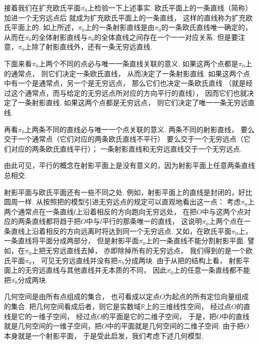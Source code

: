 接着我们在扩充欧氏平面\(\overline{\pi_0}\)上检验一下上述事实.
欧氏平面上的一条直线（简称）加进一个无穷远点后
就成为扩充欧氏平面上的一条直线，
这样的直线称为扩充欧氏平面上的.
如上所述，\(\overline{\pi_0}\)上的一条射影直线是由\(\pi_0\)的一条欧氏直线唯一确定的，
从而在\(\overline{\pi_0}\)的全体射影直线与\(\pi_0\)的全体直线之间存在一个一一对应关系.
但是要注意，\(\overline{\pi_0}\)上除了射影直线外，还有一条无穷远直线.

下面来看\(\overline{\pi_0}\)上两个不同的点必与唯一一条直线关联的意义.
如果这两个点都是\(\pi_0\)上的通常点，
则它们决定一条欧氏直线，
从而决定了一条射影直线.
如果这两个点中有一个是通常点，另一个是无穷远点，
那么它们也决定一条欧氏直线
（就是经过这个通常点，而与给定的无穷远点所对应的方向平行的直线），
因而它们也就决定了一条射影直线.
如果这两个点都是无穷远点，
则它们决定了唯一一条无穷远直线.

再看\(\overline{\pi_0}\)上两条不同的直线必与唯一一个点关联的意义.
两条不同的射影直线，
要么交于一个通常点（它们对应的两条欧氏直线不平行）
要么交于一个无穷远点（它们对应的两条欧氏直线平行）；
一条射影直线和无穷远直线交于一个无穷远点.

由此可见，平行的概念在射影平面上是没有意义的，因为射影平面上任意两条直线总相交.

射影平面与欧氏平面还有一些不同之处.
例如，射影平面上的直线是封闭的，好比圆周一样.
从按照把的模型引进无穷远点的规定可以直观地看出这一点：
考虑\(\overline{\pi_0}\)上两个通常点在一条直线\(l\)上沿着相反的方向跑向无穷远处，
在把\(O\)中与这两个点对应的两条直线都将趋于把\(O\)中与\(l\)平行的那条唯一的直线，
这说明\(\overline{\pi_0}\)上两个点在一条直线上沿着相反的方向远离时将达到同一个无穷远点.
又如，在欧氏平面\(\pi_0\)上，一条直线将平面分成两部分，
但是射影平面\(\overline{\pi_0}\)上的一条直线不能分割射影平面.
譬如，在\(\overline{\pi_0}\)上把无穷远直线去掉，
亦即除掉所有的无穷远点，
我们得到的是一个欧氏平面\(\pi_0\)，
可见无穷远直线并没有把\(\overline{\pi_0}\)分成两块.
由于从把的结构上看，
射影平面上的无穷远直线与其他直线并无本质的不同，
因此\(\overline{\pi_0}\)上的任意一条直线都不能把\(\overline{\pi_0}\)分成两块.

几何空间是由所有点组成的集合，
也可看成以定点\(O\)为起点的所有定位向量组成的集合.
把几何空间看成后者，则它是实数域\(\mathbb{R}\)上的三维线性空间，
经过点\(O\)的直线是它的一维子空间，
经过点\(O\)的平面是它的二维子空间，
于是，把\(O\)中的直线就是几何空间的一维子空间，把\(O\)中的平面就是几何空间的二维子空间.
由于把\(O\)本身就是一个射影平面，
于是受此启发，我们考虑下述几何模型.

